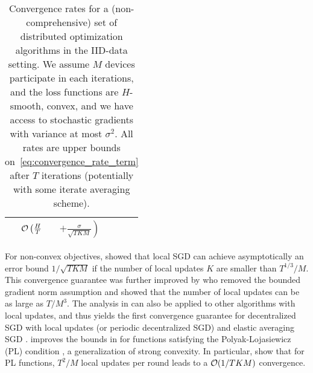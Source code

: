 \begin{table}
\begin{centering}
\begin{minipage}{\linewidth}
{\begin{tabular}{@{}llll@{\hskip-2pt}l@{}}
     & $\mathcal{O} \left(\frac{H}{T} \right.$ & $\left. + \frac{\sigma}{\sqrt{TKM}} \right)$ \\
\bottomrule
\end{tabular}
}%
\end{minipage}
\caption{Convergence rates for a (non-comprehensive) set of distributed optimization algorithms in the IID-data setting. We assume $M$ devices participate in each iterations, and the loss functions are $H$-smooth, convex, and we have access to stochastic gradients with variance at most $\sigma^2$. All rates are upper bounds on~\eqref{eq:convergence_rate_term} after $T$ iterations (potentially with some iterate averaging scheme).\\
}
\label{tab:iid-convergence}
\end{centering}
\end{table}


For non-convex objectives, \citet{yu2018parallel} showed that local SGD can achieve asymptotically an error bound $1/\sqrt{TKM}$ if the number of local updates $K$ are smaller than $T^{1/3}/M$. This convergence guarantee was further improved by \citet{wang2018cooperative} who removed the bounded gradient norm assumption and showed that the number of local updates can be as large as $T/M^3$. The analysis in \cite{wang2018cooperative} can also be applied to other algorithms with local updates, and thus yields the first convergence guarantee for decentralized SGD with local updates (or periodic decentralized SGD) and elastic averaging SGD \cite{zhang2015deep}.
\citet{haddadpour2019local} improves the bounds in \citet{wang2018cooperative} for functions satisfying the Polyak-Lojasiewicz (PL) condition \citep{karimi2016linear}, a generalization of strong convexity. In particular, \citet{haddadpour2019local} show that for PL functions, $T^2/M$ local updates per round leads to a $\mathcal{O}(1/TKM)$ convergence.

